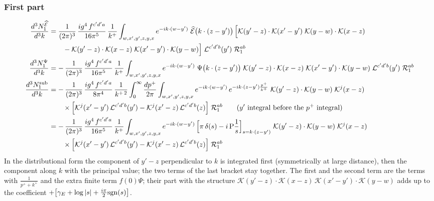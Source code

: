 \documentclass[9pt]{article}
\numberwithin{equation}{section}
\begin{document}
\subsubsection{First part}
\begin{align}
\frac{d^{3}N_{1}^{\widehat{\mathcal{E}}}}{d^{3}k} & = \frac{1}{(2\pi)^{3}}\, \frac{ig^{4}\,f^{c'd'a}}{16\pi^{5}}\, \frac{1}{k^{+}}\int_{w,x',y',z,y,x} e^{-ik\cdot (w-y')}\;\widehat{\mathcal{E}}\big(k\cdot(z-y')\big)\,\Big[\mathcal{K}(y'-z)\cdot\mathcal{K}(x'-y')\;\mathcal{K}(y-w)\cdot\mathcal{K}(x-z)\notag \\ & \qquad-\mathcal{K}(y'-z)\cdot\mathcal{K}(x-z)\;\mathcal{K}(x'-y')\cdot\mathcal{K}(y-w)\Big]\;\mathcal{L}^{c'd'b}(y')\;\mathcal{R}_{1}^{ab}\\
\frac{d^{3}N_{1}^{\Psi}}{d^{3}k} & = -\,\frac{1}{(2\pi)^{3}}\, \frac{ig^{4}\,f^{c'd'a}}{16\pi^{5}}\, \frac{1}{k^{+}}\int_{w,x',y',z,y,x} e^{-ik\cdot (w-y')}\;\Psi\big(k\cdot(z-y')\big)\;\mathcal{K}(y'-z)\cdot\mathcal{K}(x-z)\;\mathcal{K}(x'-y')\cdot\mathcal{K}(y-w)\;\mathcal{L}^{c'd'b}(y')\;\mathcal{R}_{1}^{ab}\\
\frac{d^{3}N_{1}^{\rm sub}}{d^{3}k} & = -\,\frac{1}{(2\pi)^{3}}\, \frac{ig^{4}\,f^{c'd'a}}{8\pi^{4}}\, \frac{1}{k^{+\,2}}\int_{0}^{\infty}\frac{dp^{+}}{2\pi}\int_{w,x',y',z,y,x} e^{-ik\cdot (w-y')}\, e^{-ik\cdot (z-y')\frac{p^{+}}{k^{+}}}\;\mathcal{K}(y'-z)\cdot\mathcal{K}(y-w)\;\mathcal{K}^{j}(x-z)\notag \\ & \qquad\times\Big[\mathcal{K}^{j}(x'-y')\,\mathcal{L}^{c'd'b}(y')-\mathcal{K}^{j}(x'-z)\,\mathcal{L}^{c'd'b}(z)\Big]\;\mathcal{R}_{1}^{ab}\qquad\text{($y'$ integral before the $p^{+}$ integral)}\notag\\
& = -\,\frac{1}{(2\pi)^{3}}\, \frac{ig^{4}\,f^{c'd'a}}{16\pi^{5}}\, \frac{1}{k^{+}}\int_{w,x',y',z,y,x} e^{-ik\cdot (w-y')}\,\Big[\pi\,\delta(s)-i\,{\rm P}\frac{1}{s}\Big]_{s=k\cdot(z-y')}\;\mathcal{K}(y'-z)\cdot\mathcal{K}(y-w)\;\mathcal{K}^{j}(x-z)\notag \\ & \qquad\times\Big[\mathcal{K}^{j}(x'-y')\,\mathcal{L}^{c'd'b}(y')-\mathcal{K}^{j}(x'-z)\,\mathcal{L}^{c'd'b}(z)\Big]\;\mathcal{R}_{1}^{ab}
\end{align}
In the distributional form the component of $y'-z$ perpendicular to $k$ is integrated first (symmetrically at large distance), then the component along $k$ with the principal value; the two terms of the last bracket stay together. The first and the second term are the terms with $\frac{1}{p^{+}+k^{+}}$ and the extra finite term $f(0)\Psi$; their part with the structure $\mathcal{K}(y'-z)\cdot\mathcal{K}(x-z)\,\mathcal{K}(x'-y')\cdot\mathcal{K}(y-w)$ adds up to the coefficient $+\big[\gamma_{E}+\log|s|+\frac{i\pi}{2}{\rm sgn}(s)\big]$.\par
\end{document}

